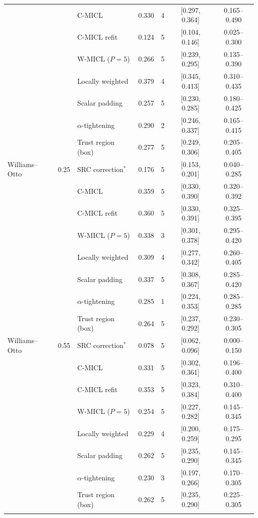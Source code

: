 {\begin{longtable}{llllccc}
 &  & C-MICL & 0.330 & 4 & [0.297, 0.364] & 0.165--0.490 \\
 &  & C-MICL refit & 0.124 & 5 & [0.104, 0.146] & 0.025--0.300 \\
 &  & W-MICL ($P{=}5$) & 0.266 & 5 & [0.239, 0.295] & 0.135--0.390 \\
 &  & Locally weighted & 0.379 & 4 & [0.345, 0.413] & 0.310--0.435 \\
 &  & Scalar padding & 0.257 & 5 & [0.230, 0.285] & 0.180--0.425 \\
 &  & $\alpha$-tightening & 0.290 & 2 & [0.246, 0.337] & 0.165--0.415 \\
 &  & Trust region (box) & 0.277 & 5 & [0.249, 0.306] & 0.205--0.405 \\
\addlinespace[2pt]
Williams--Otto & 0.25 & SRC correction$^{\ast}$ & 0.176 & 5 & [0.153, 0.201] & 0.040--0.285 \\
 &  & C-MICL & 0.359 & 5 & [0.330, 0.390] & 0.320--0.392 \\
 &  & C-MICL refit & 0.360 & 5 & [0.330, 0.391] & 0.325--0.395 \\
 &  & W-MICL ($P{=}5$) & 0.338 & 3 & [0.301, 0.378] & 0.295--0.420 \\
 &  & Locally weighted & 0.309 & 4 & [0.277, 0.342] & 0.260--0.405 \\
 &  & Scalar padding & 0.337 & 5 & [0.308, 0.367] & 0.285--0.420 \\
 &  & $\alpha$-tightening & 0.285 & 1 & [0.224, 0.353] & 0.285--0.285 \\
 &  & Trust region (box) & 0.264 & 5 & [0.237, 0.292] & 0.230--0.305 \\
\addlinespace[2pt]
Williams--Otto & 0.55 & SRC correction$^{\ast}$ & 0.078 & 5 & [0.062, 0.096] & 0.000--0.150 \\
 &  & C-MICL & 0.331 & 5 & [0.302, 0.361] & 0.196--0.400 \\
 &  & C-MICL refit & 0.353 & 5 & [0.323, 0.384] & 0.310--0.400 \\
 &  & W-MICL ($P{=}5$) & 0.254 & 5 & [0.227, 0.282] & 0.145--0.345 \\
 &  & Locally weighted & 0.229 & 4 & [0.200, 0.259] & 0.175--0.295 \\
 &  & Scalar padding & 0.262 & 5 & [0.235, 0.290] & 0.145--0.345 \\
 &  & $\alpha$-tightening & 0.230 & 3 & [0.197, 0.266] & 0.170--0.305 \\
 &  & Trust region (box) & 0.262 & 5 & [0.235, 0.290] & 0.225--0.305 \\
\addlinespace[2pt]

\end{longtable}}

